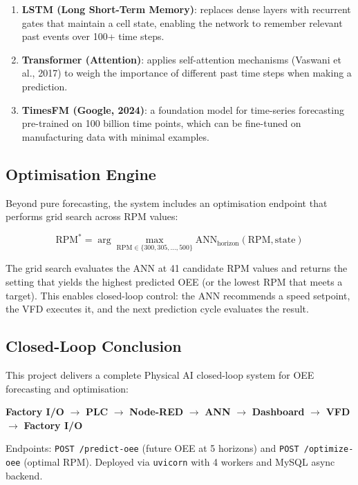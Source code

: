 \documentclass[a4paper,11pt]{article}
\begin{document}
\begin{enumerate}
    \item \textbf{LSTM (Long Short-Term Memory)}: replaces dense layers with recurrent gates that maintain a cell state, enabling the network to remember relevant past events over 100+ time steps.

    \item \textbf{Transformer (Attention)}: applies self-attention mechanisms (Vaswani et al., 2017) to weigh the importance of different past time steps when making a prediction.

    \item \textbf{TimesFM (Google, 2024)}: a foundation model for time-series forecasting pre-trained on 100 billion time points, which can be fine-tuned on manufacturing data with minimal examples.
\end{enumerate}

\subsection{Optimisation Engine}

Beyond pure forecasting, the system includes an optimisation endpoint that performs grid search across RPM values:

\begin{equation}
\text{RPM}^* = \arg\max_{\text{RPM} \in \{300, 305, \dots, 500\}} \text{ANN}_{\text{horizon}}(\text{RPM}, \text{state})
\end{equation}

The grid search evaluates the ANN at 41 candidate RPM values and returns the setting that yields the highest predicted OEE (or the lowest RPM that meets a target). This enables closed-loop control: the ANN recommends a speed setpoint, the VFD executes it, and the next prediction cycle evaluates the result.

\subsection{Closed-Loop Conclusion}

This project delivers a complete Physical AI closed-loop system for OEE forecasting and optimisation:

\medskip
\begin{center}
\textbf{Factory I/O} $\rightarrow$ \textbf{PLC} $\rightarrow$ \textbf{Node-RED} $\rightarrow$ \textbf{ANN} $\rightarrow$ \textbf{Dashboard} $\rightarrow$ \textbf{VFD} $\rightarrow$ \textbf{Factory I/O}
\end{center}
\medskip
\noindent Endpoints: \texttt{POST /predict-oee} (future OEE at 5 horizons) and \texttt{POST /optimize-oee} (optimal RPM). Deployed via \texttt{uvicorn} with 4 workers and MySQL async backend.
\end{document}
